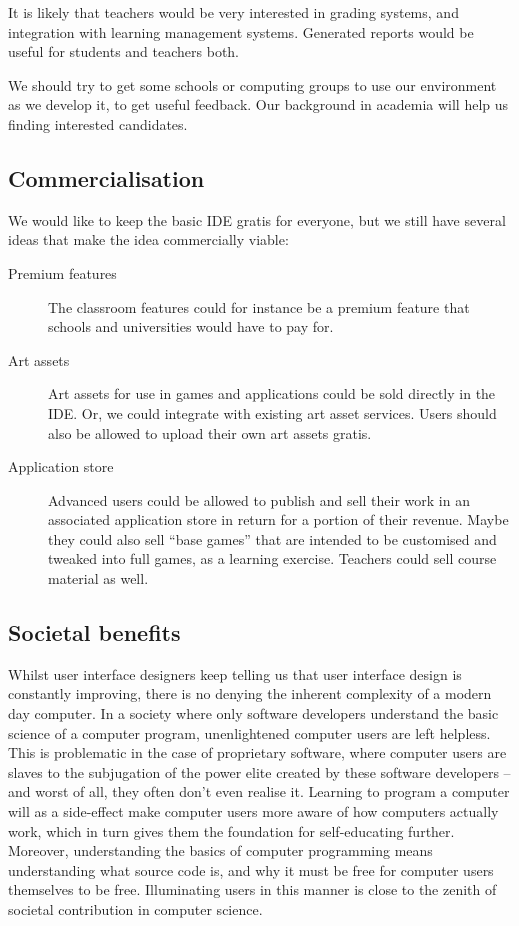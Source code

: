 It is likely that teachers would be very interested in grading systems, and 
integration with learning management systems. Generated reports would be 
useful for students and teachers both.

We should try to get some schools or computing groups to use our environment 
as we develop it, to get useful feedback. Our background in academia will
help us finding interested candidates.

\subsection{Commercialisation}

We would like to keep the basic IDE gratis for everyone, but we still have
several ideas that make the idea commercially viable:

\begin{description}
  \item[Premium features]
    The classroom features could for instance be a premium feature that schools
    and universities would have to pay for.
  \item[Art assets]
    Art assets for use in games and applications could be sold directly in the
    IDE. Or, we could integrate with existing art asset services. Users should 
    also be allowed to upload their own art assets gratis.
  \item[Application store]
    Advanced users could be allowed to publish and sell their work in an 
    associated application store in return for a portion of their revenue. 
    Maybe they could also sell ``base games'' that are intended to be 
    customised and tweaked into full games, as a learning exercise. Teachers 
    could sell course material as well.
\end{description}

\subsection{Societal benefits}
Whilst user interface designers keep telling us that user interface design is 
constantly improving, there is no denying the inherent complexity of a modern 
day computer. In a society where only software developers understand the basic 
science of a computer program, unenlightened computer users are left helpless. 
This is problematic in the case of proprietary software, where computer users 
are slaves to the subjugation of the power elite created by these software 
developers -- and worst of all, they often don't even realise it. Learning to 
program a computer will as a side-effect make computer users more aware of how 
computers actually work, which in turn gives them the foundation for 
self-educating further. Moreover, understanding the basics of computer 
programming means understanding what source code is, and why it must be free 
for computer users themselves to be free. Illuminating users in this manner is 
close to the zenith of societal contribution in computer science.


